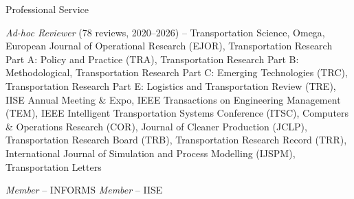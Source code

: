 \begin{rubric}{Professional Service}
\vspace{5pt}

    \textit{Ad-hoc Reviewer} (78 reviews, 2020--2026) -- Transportation Science, Omega, European Journal of Operational Research (EJOR), Transportation Research Part A: Policy and Practice (TRA), Transportation Research Part B: Methodological, Transportation Research Part C: Emerging Technologies (TRC), Transportation Research Part E: Logistics and Transportation Review (TRE), IISE Annual Meeting \& Expo, IEEE Transactions on Engineering Management (TEM), IEEE Intelligent Transportation Systems Conference (ITSC), Computers \& Operations Research (COR), Journal of Cleaner Production (JCLP), Transportation Research Board (TRB), Transportation Research Record (TRR), International Journal of Simulation and Process Modelling (IJSPM), Transportation Letters

\vspace{5pt}

%
	\textit{Member} -- INFORMS
%
	\textit{Member} -- IISE 

\end{rubric}